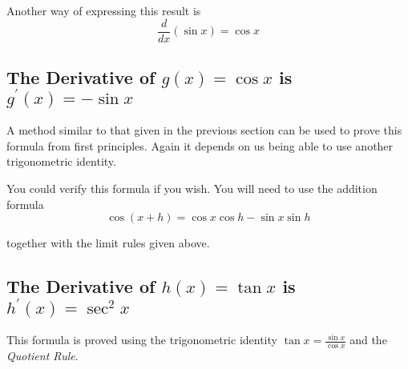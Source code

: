 Another way of expressing this result is
\begin{equation*}\frac{d}{d x} \left (\sin  x\right ) =\cos  x
\end{equation*}

\subsection{The Derivative of $g (x) =\cos  x$ is $g^{ \prime } (x) = -\sin  x$}
A method similar to that given in the previous section can be used to prove this formula from first principles. Again
it depends on us being able to use another trigonometric identity. 

You could verify this formula if you wish. You
will need to use the addition formula
\begin{equation*}\cos  (x +h) =\cos  x \cos  \text{}h -\sin  x \sin  \text{}h
\end{equation*}

together with the limit rules given above. 

\subsection{The Derivative of $h (x) =\tan  x$ is $h^{ \prime } (x) =\sec ^{2} x$}
This formula is proved using the trigonometric identity $\tan  x =\frac{\sin  x}{\cos  x}$ and the \emph{Quotient Rule}.